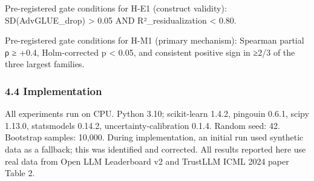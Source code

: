 Pre-registered gate conditions for H-E1 (construct validity): SD(AdvGLUE_drop) > 0.05 AND R²_residualization < 0.80.

Pre-registered gate conditions for H-M1 (primary mechanism): Spearman partial ρ ≥ +0.4, Holm-corrected p < 0.05, and consistent positive sign in ≥2/3 of the three largest families.

\subsubsection{4.4 Implementation}

All experiments run on CPU. Python 3.10; scikit-learn 1.4.2, pingouin 0.6.1, scipy 1.13.0, statsmodels 0.14.2, uncertainty-calibration 0.1.4. Random seed: 42. Bootstrap samples: 10,000. During implementation, an initial run used synthetic data as a fallback; this was identified and corrected. All results reported here use real data from Open LLM Leaderboard v2 and TrustLLM ICML 2024 paper Table 2.


